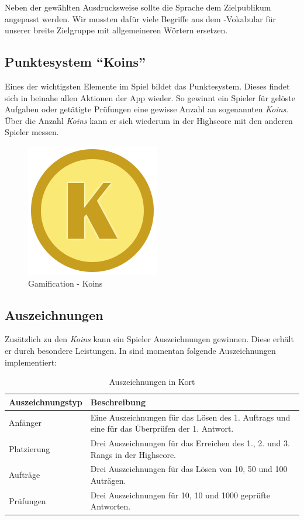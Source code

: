 Neben der gewählten Ausdrucksweise sollte die Sprache dem Zielpublikum angepasst werden.
Wir mussten dafür viele Begriffe aus dem -Vokabular für unserer breite Zielgruppe mit allgemeineren Wörtern ersetzen.

\subsection{Punktesystem "`Koins"'}
Eines der wichtigsten Elemente im Spiel bildet das Punktesystem. Dieses findet sich in beinahe allen Aktionen der App wieder.
So gewinnt ein Spieler für gelöste Aufgaben oder getätigte Prüfungen eine gewisse Anzahl an sogenannten \emph{Koins}.
Über die Anzahl \emph{Koins} kann er sich wiederum in der Highscore mit den anderen Spieler messen.

\begin{figure}[H]
	\centering
	\includegraphics[scale=0.4]{images/gamification/gamification-koin}
	\caption{Gamification - Koins}
	\label{gamification-koins}
\end{figure}

\subsection{Auszeichnungen}
Zusätzlich zu den \emph{Koins} kann ein Spieler Auszeichnungen gewinnen. Diese erhält er durch besondere Leistungen. In \kort{} sind momentan folgende Auszeichnungen implementiert:

\begin{table}[H]
\centering
\begin{tabular}{|p{0.25\twocelltabwidth}|p{0.75\twocelltabwidth}|}
\hline 
\textbf{Auszeichnungstyp} & \textbf{Beschreibung} \\ 
\hline 
Anfänger & Eine Auszeichnungen für das Lösen des 1. Auftrags und eine für das Überprüfen der 1. Antwort. \\ 
\hline 
Platzierung & Drei Auszeichnungen für das Erreichen des 1., 2. und 3. Rangs in der Highscore. \\ 
\hline 
Aufträge & Drei Auszeichnungen für das Lösen von 10, 50 und 100 Auträgen. \\ 
\hline 
Prüfungen & Drei Auszeichnungen für 10, 10 und 1000 geprüfte Antworten. \\ 
\hline 
\end{tabular} 
\caption{Auszeichnungen in Kort}
\label{kort-badges}
\end{table}

